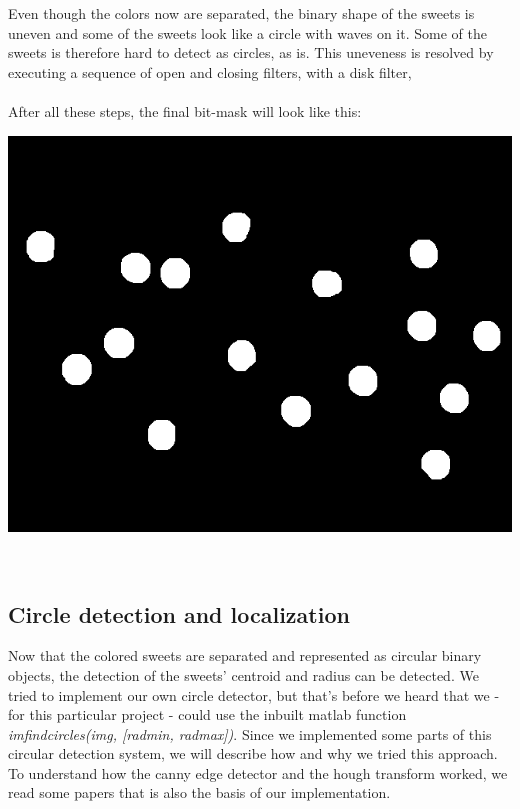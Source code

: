 Even though the colors now are separated, the binary shape of the sweets is uneven and some of the sweets look like a circle with waves on it. Some of the sweets is therefore hard to detect as circles, as is. This uneveness is resolved by executing a sequence of open and closing filters, with a disk filter,
\\

\mbox{}\\
After all these steps, the final bit-mask will look like this:
\\ \newline
\centerline{\includegraphics[scale=0.3]{../results/sweetsA03_blue_sweets.png}}
\mbox{}\\
\subsection{Circle detection and localization}
Now that the colored sweets are separated and represented as circular binary objects, the detection of the sweets' centroid and radius can be detected. We tried to implement our own circle detector, but that's before we heard that we - for this particular project - could use the inbuilt matlab function \emph{imfindcircles(img, [radmin, radmax])}. Since we implemented some parts of this circular detection system, we will describe how and why we tried this approach. To understand how the canny edge detector and the hough transform worked, we read some papers \cite{canny1,hough1} that is also the basis of our implementation.
